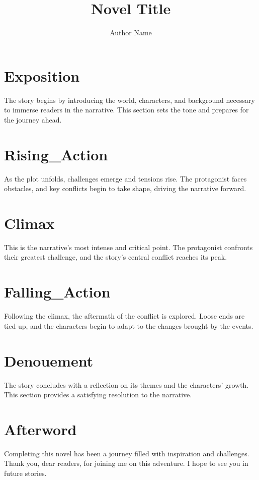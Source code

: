 \documentclass[12pt]{book}
\title{Novel Title}
\author{Author Name}
\date{}
\begin{document}
\frontmatter
\maketitle

\tableofcontents

\mainmatter

\chapter*{Exposition}
The story begins by introducing the world, characters, and background necessary to immerse readers in the narrative. This section sets the tone and prepares for the journey ahead.

\chapter*{Rising_Action}
As the plot unfolds, challenges emerge and tensions rise. The protagonist faces obstacles, and key conflicts begin to take shape, driving the narrative forward.

\chapter*{Climax}
This is the narrative's most intense and critical point. The protagonist confronts their greatest challenge, and the story's central conflict reaches its peak.

\chapter*{Falling_Action}
Following the climax, the aftermath of the conflict is explored. Loose ends are tied up, and the characters begin to adapt to the changes brought by the events.

\chapter*{Denouement}
The story concludes with a reflection on its themes and the characters' growth. This section provides a satisfying resolution to the narrative.

\backmatter
\chapter*{Afterword}
Completing this novel has been a journey filled with inspiration and challenges. Thank you, dear readers, for joining me on this adventure. I hope to see you in future stories.
\end{document}
